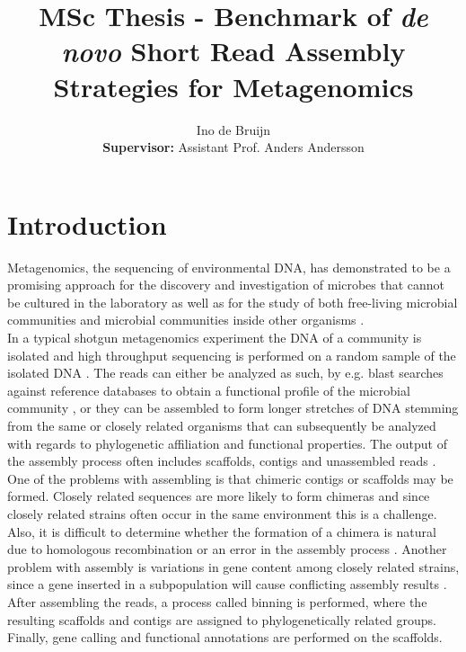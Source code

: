 \documentclass[a4paper,12pt]{report}
\begin{document}


\title{MSc Thesis - Benchmark of {\em de novo} Short Read Assembly Strategies for Metagenomics}
\author{Ino de Bruijn\\ {\bf Supervisor:} Assistant Prof. Anders Andersson}

\maketitle

\tableofcontents

\chapter{Introduction}
Metagenomics, the sequencing of environmental DNA, has demonstrated to be a
promising approach for the discovery and investigation of microbes that cannot
be cultured in the laboratory \cite{Eisen17355177} as well as for the study of
both free-living microbial communities \cite{Andersson18497291} and microbial
communities inside other organisms \cite{Qin20203603,Hess21273488}.\\


In a typical shotgun metagenomics experiment the DNA of a community is isolated
and high throughput sequencing is performed on a random sample of the isolated
DNA \cite{Morgan20419134}. The reads can either be analyzed as such, by e.g.
blast searches against reference databases to obtain a functional profile of
the microbial community \cite{Tringe15845853}, or they can be assembled to form
longer stretches of DNA stemming from the same or closely related organisms
that can subsequently be analyzed with regards to phylogenetic affiliation and
functional properties. The output of the assembly process often includes
scaffolds, contigs and unassembled reads \cite{Mavromatis17468765}. One of the
problems with assembling is that chimeric contigs or scaffolds may be formed.
Closely related sequences are more likely to form chimeras and since closely
related strains often occur in the same environment this is a challenge. Also,
it is difficult to determine whether the formation of a chimera is natural due
to homologous recombination or an error in the assembly process
\cite{Tyson14961025}. Another problem with assembly is variations in gene
content among closely related strains, since a gene inserted in a subpopulation
will cause conflicting assembly results \cite{Hallam17114289}. After assembling
the reads, a process called binning is performed, where the resulting scaffolds
and contigs are assigned to phylogenetically related groups. Finally, gene
calling and functional annotations are performed on the scaffolds.\\
\end{document}
